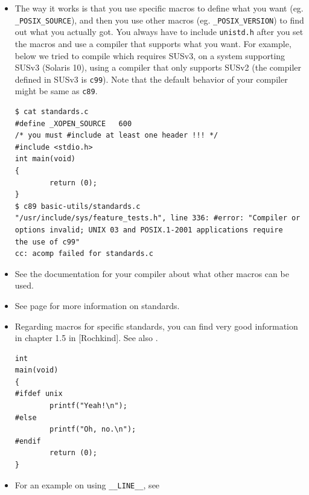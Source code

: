 \begin{itemize}
\item The way it works is that you use specific macros to define what you
want (eg. \texttt{\_POSIX\_SOURCE}), and then you use other macros (eg.
\texttt{\_POSIX\_VERSION}) to find out what you actually got.  You always have
to include \texttt{unistd.h} after you set the macros and use a compiler that
supports what you want.  For example, below we tried to compile
 which requires SUSv3, on a system supporting
SUSv3 (Solaris 10), using a compiler that only supports SUSv2 (the compiler
defined in SUSv3 is \texttt{c99}).  Note that the default behavior of your
compiler might be same as \texttt{c89}.

\begin{verbatim}
$ cat standards.c 
#define _XOPEN_SOURCE   600
/* you must #include at least one header !!! */
#include <stdio.h>
int main(void)
{
        return (0);
}
$ c89 basic-utils/standards.c 
"/usr/include/sys/feature_tests.h", line 336: #error: "Compiler or
options invalid; UNIX 03 and POSIX.1-2001 applications require
the use of c99"
cc: acomp failed for standards.c
\end{verbatim}
\item See the documentation for your compiler about what other macros can be
used.
\item See page \pageref{C_LANGUAGE} for more information on standards.
\item Regarding macros for specific standards, you can find very good
information in chapter 1.5 in [Rochkind]. See also
.

\begin{verbatim}
int
main(void)
{
#ifdef unix
        printf("Yeah!\n");
#else
        printf("Oh, no.\n");
#endif
        return (0);
}
\end{verbatim}
\item For an example on using \texttt{\_\_LINE\_\_}, see
\end{itemize}



